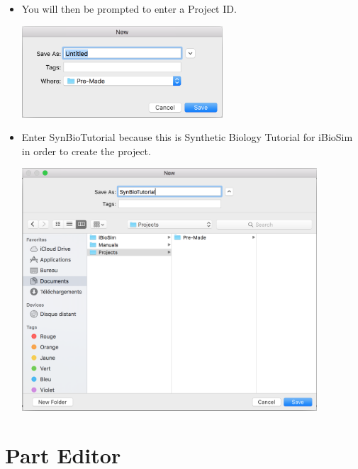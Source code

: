 \documentclass[titlepage,11pt]{article}
\begin{document}
\begin{itemize}
\item You will then be prompted to enter a Project ID.

\begin{center}
\includegraphics[width=75mm]{screenshots/ProjectIdGT}
\end{center}

\item Enter SynBioTutorial because this is Synthetic Biology Tutorial for iBioSim in order to create the project.

\begin{center}
\includegraphics[width=110mm]{screenshots/ProjectIdGT2}
\end{center}

\end{itemize}

\section{Part Editor}
\end{document}
